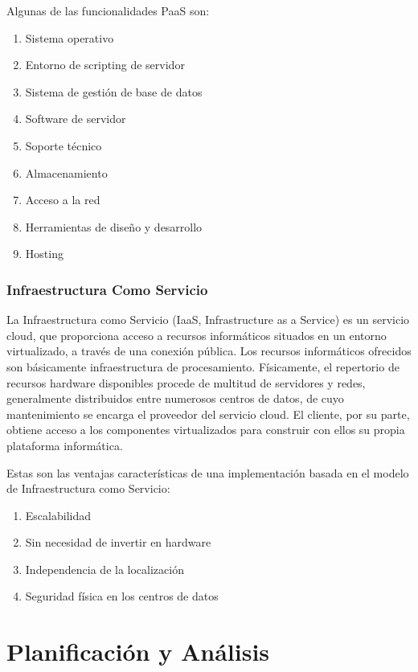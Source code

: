 \documentclass[a4paper,11pt]{book}
\begin{document}
Algunas de las funcionalidades PaaS son:

\begin{enumerate}
\item Sistema operativo 
\item Entorno de scripting de servidor 
\item Sistema de gestión de base de datos 
\item Software de servidor 
\item Soporte técnico 
\item Almacenamiento 
\item Acceso a la red 
\item Herramientas de diseño y desarrollo 
\item Hosting 
\end{enumerate}


\subsection{Infraestructura Como Servicio}
La Infraestructura como Servicio\cite{iaas} (IaaS, Infrastructure as a Service) es un servicio cloud, que proporciona acceso a recursos informáticos situados en un entorno virtualizado, a través de una conexión pública. Los recursos informáticos ofrecidos  son básicamente infraestructura de procesamiento. Físicamente, el repertorio de recursos hardware disponibles procede de multitud de servidores y redes, generalmente distribuidos entre numerosos centros de datos, de cuyo mantenimiento se encarga el proveedor del servicio cloud. El cliente, por su parte, obtiene acceso a los componentes virtualizados para construir con ellos su propia plataforma informática.

Estas son las ventajas características de una implementación basada en el modelo de Infraestructura como Servicio:

\begin{enumerate}
\item Escalabilidad
\item Sin necesidad de invertir en hardware
\item Independencia de la localización
\item Seguridad física en los centros de datos
\end{enumerate}




\chapter{Planificación y Análisis }
\end{document}
